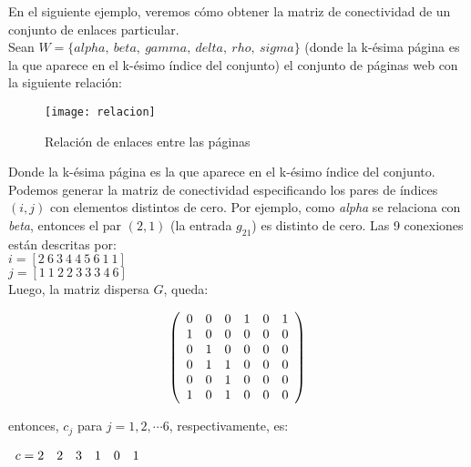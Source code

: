 \documentclass[letterpaper,11pt]{article}
\begin{document}
En el siguiente ejemplo, veremos cómo obtener la matriz de conectividad de un conjunto de enlaces particular.\\

Sean $ W= \{ alpha,\ beta,\ gamma,\ delta,\ rho,\ sigma\}$ (donde la k-ésima página es la que aparece en el k-ésimo índice del conjunto) el conjunto de  páginas web con la siguiente relación:\\

\begin{figure}[H]
  \centering
    \texttt{[image: relacion]}
  \caption{Relación de enlaces entre las páginas}
  \label{fig:ejemplo}
\end{figure}

Donde la k-ésima página es la que aparece en el k-ésimo índice del conjunto.\\

\newpage
Podemos generar la matriz de conectividad especificando los pares de índices $(i,j)$ con elementos distintos de cero. Por ejemplo, como \emph{alpha} se relaciona con \emph{beta}, entonces el par $(2,1)$ (la entrada $g_{21}$) es distinto de cero. Las 9 conexiones están descritas por:
\quad\\

$i = [2\ 6\ 3\ 4\ 4\ 5\ 6\ 1\ 1]$\\

 $j = [1\ 1\ 2\ 2\ 3\ 3\ 3\ 4\ 6]$\\

Luego, la matriz dispersa $G$, queda:


\[
\left(
\begin{array}{c c c c c c}
0&0&0&1&0&1\\
1&0&0&0&0&0\\
0&1&0&0&0&0\\
0&1&1&0&0&0\\
0&0&1&0&0&0\\
1&0&1&0&0&0\\
\end{array}
\right)
\]

\bigskip

entonces, $c_j$ para $j = 1,2,\cdots 6$, respectivamente, es:\\
\begin{center}
$\begin{array}{c c c c c c c}
c = 2&2&3&1&0&1\\
\end{array}$

\end{center}
\end{document}
